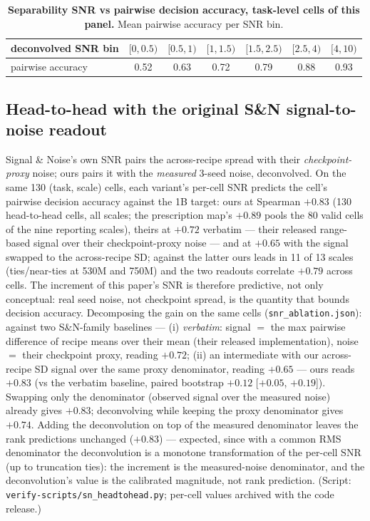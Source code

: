 \begin{table}[!htbp]
\centering
\caption{\textbf{Separability SNR vs pairwise decision accuracy, task-level cells of this
panel.} Mean pairwise accuracy per SNR bin.}
\label{tab:snr-acc-bins}
\footnotesize
\begin{tabular}{@{}lcccccc@{}}
\toprule
deconvolved SNR bin & $[0, 0.5)$ & $[0.5, 1)$ & $[1, 1.5)$ & $[1.5, 2.5)$ & $[2.5, 4)$ & $[4, 10)$ \\
\midrule
pairwise accuracy & 0.52 & 0.63 & 0.72 & 0.79 & 0.88 & 0.93 \\
\bottomrule
\end{tabular}
\end{table}

\subsection{Head-to-head with the original S\&N signal-to-noise readout}
\label{app:t3-h2h}

Signal \& Noise's own SNR pairs the across-recipe spread with their \emph{checkpoint-proxy}
noise; ours pairs it with the \emph{measured} 3-seed noise, deconvolved. On the same 130
(task, scale) cells, each variant's per-cell SNR predicts the cell's pairwise decision
accuracy against the 1B target: ours at Spearman $+0.83$ (130 head-to-head cells, all scales; the prescription map's $+0.89$ pools the 80 valid cells of the nine reporting scales), theirs at $+0.72$ verbatim --- their released
range-based signal over their checkpoint-proxy noise --- and at $+0.65$ with the signal
swapped to the across-recipe SD; against the latter ours leads in 11 of 13 scales
(ties/near-ties at 530M and 750M) and the two readouts correlate $+0.79$ across cells. The increment of this paper's SNR is therefore predictive, not only conceptual: real
seed noise, not checkpoint spread, is the quantity that bounds decision accuracy.
Decomposing the gain on the same cells (\texttt{snr\_ablation.json}): against two S\&N-family baselines --- (i) \emph{verbatim}: signal $=$ the max pairwise difference of recipe means over their mean (their released implementation), noise $=$ their checkpoint proxy, reading $+0.72$; (ii) an intermediate with our across-recipe SD signal over the same proxy denominator, reading $+0.65$ --- ours reads $+0.83$ (vs the verbatim baseline, paired bootstrap $+0.12$ [$+0.05$, $+0.19$]). Swapping only the denominator (observed signal over the
measured noise) already gives $+0.83$; deconvolving while keeping the proxy denominator
gives $+0.74$. Adding the deconvolution on top of the measured denominator leaves the rank
predictions unchanged ($+0.83$) --- expected, since with a common RMS denominator the
deconvolution is a monotone transformation of the per-cell SNR (up to truncation ties): the
increment is the measured-noise denominator, and the deconvolution's value is the calibrated
magnitude, not rank prediction.
(Script: \texttt{verify-scripts/sn\_headtohead.py}; per-cell values archived with the
code release.)

